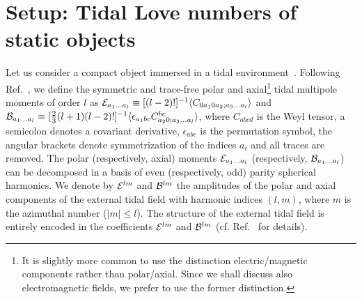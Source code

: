 \documentclass[aps,twocolumn,showpacs,preprintnumbers,nofootinbib,prd,superscriptaddress,groupedaddress,10pt]{revtex4-1}
\begin{document}
\section{Setup: Tidal Love numbers of static objects} \label{setup}
Let us consider a compact object immersed in a tidal environment~\cite{PoissonWill}. Following Ref.~\cite{Binnington:2009bb}, we define the symmetric and trace-free
polar and axial\footnote{It is slightly more common to use the distinction electric/magnetic components rather than polar/axial. Since we shall discuss also electromagnetic fields, we prefer to use the former distinction.} tidal multipole moments of order $l$ as ${\cal E}_{a_1\dots a_l}\equiv [(l-2)!]^{-1}\langle
C_{0a_10a_2;a_3\dots a_l}\rangle$ and
${\cal B}_{a_1\dots a_l}\equiv [\frac{2}{3}(l+1)(l-2)!]^{-1}\langle\epsilon_{a_1 b c} C^{bc}_{a_2 0;a_3\dots a_l}\rangle$,
where $C_{abcd}$ is the Weyl tensor, a semicolon denotes a covariant derivative, $\epsilon_{abc}$ is the permutation
symbol, the angular brackets denote symmetrization of the indices $a_i$ and all traces are removed. 
The polar (respectively, axial) moments ${\cal E}_{a_1\dots a_l}$ (respectively, ${\cal B}_{a_1\dots a_l}$) can be decomposed in a basis of even (respectively, odd) parity spherical harmonics. 
%
We denote by ${\cal E}^{lm}$ and  ${\cal B}^{lm}$ the amplitudes of the polar and axial components of the external tidal field with harmonic indices $(l,m)$, where $m$ is the azimuthal number ($|m|\leq l$). The structure of the external tidal field is entirely encoded in the coefficients ${\cal E}^{lm}$ and  ${\cal B}^{lm}$ (cf. Ref.~\cite{Binnington:2009bb} for details).
\end{document}
